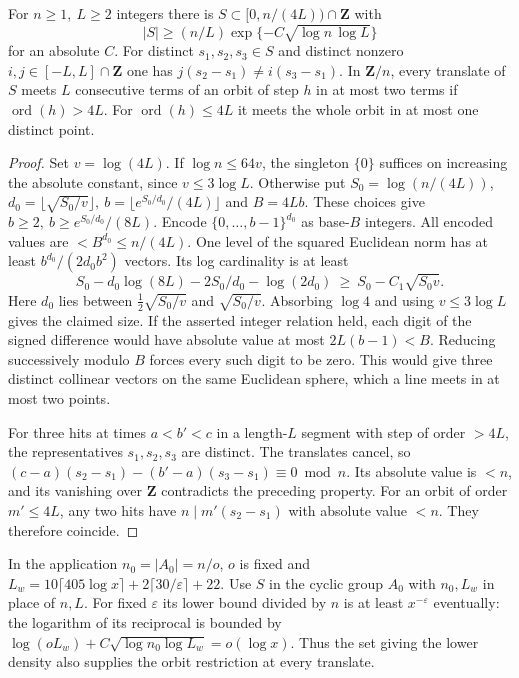 \begin{proposition}\label{host:behrend}
For \(n\ge1,\ L\ge2\) integers there is \(S\subset[0,n/(4L))\cap\mathbf Z\)
with
\[
 |S|\ge (n/L)\exp\{-C\sqrt{\log n\,\log L}\}
\]
for an absolute \(C\). For distinct \(s_1,s_2,s_3\in S\) and distinct
nonzero \(i,j\in[-L,L]\cap\mathbf Z\) one has
\(j(s_2-s_1)\ne i(s_3-s_1)\). In \(\mathbf Z/n\), every translate of
\(S\) meets \(L\) consecutive terms of an orbit of step \(h\) in at most
two terms if \(\operatorname{ord}(h)>4L\). For
\(\operatorname{ord}(h)\le4L\) it meets the whole orbit in at most one
distinct point.
\end{proposition}
\begin{proof}
Set \(v=\log(4L)\). If \(\log n\le64v\), the singleton \(\{0\}\)
suffices on increasing the absolute constant, since \(v\le3\log L\).
Otherwise put \(S_0=\log(n/(4L))\),
\(d_0=\lfloor\sqrt{S_0/v}\rfloor,\ b=\lfloor e^{S_0/d_0}/(4L)\rfloor\)
and \(B=4Lb\). These choices give \(b\ge2,\ b\ge e^{S_0/d_0}/(8L)\).
Encode \(\{0,\ldots,b-1\}^{d_0}\) as base-\(B\) integers. All encoded
values are \(<B^{d_0}\le n/(4L)\). One level of the squared Euclidean norm
has at least \(b^{d_0}/(2d_0 b^2)\) vectors. Its log cardinality is at least
\[
 S_0-d_0\log(8L)-2S_0/d_0-\log(2d_0)
 \ \ge\ S_0-C_1\sqrt{S_0 v}.
\]
Here \(d_0\) lies between \(\tfrac12\sqrt{S_0/v}\) and \(\sqrt{S_0/v}\).
Absorbing \(\log4\) and using \(v\le3\log L\) gives the claimed size.
If the asserted integer relation held, each digit of the signed
difference would have absolute value at most \(2L(b-1)<B\).
Reducing successively modulo \(B\) forces every such digit to be zero.
This would give three distinct collinear vectors on the same Euclidean
sphere, which a line meets in at most two points.

For three hits at times \(a<b'<c\) in a length-\(L\) segment with step
of order \(>4L\), the representatives \(s_1,s_2,s_3\) are distinct.
The translates cancel, so
\((c-a)(s_2-s_1)-(b'-a)(s_3-s_1)\equiv0\bmod n\).
Its absolute value is \(<n\), and its vanishing over \(\mathbf Z\)
contradicts the preceding property. For an orbit of order \(m'\le4L\),
any two hits have \(n\mid m'(s_2-s_1)\) with absolute value \(<n\).
They therefore coincide.
\end{proof}

In the application \(n_0=|A_0|=n/o\), \(o\) is fixed and
\(L_w=10\lceil405\log x\rceil+2\lceil30/\varepsilon\rceil+22\).
Use \(S\) in the cyclic group \(A_0\) with \(n_0,L_w\) in place of
\(n,L\). For fixed \(\varepsilon\) its lower bound divided by \(n\)
is at least \(x^{-\varepsilon}\) eventually: the logarithm of its
reciprocal is bounded by
\(\log(oL_w)+C\sqrt{\log n_0\log L_w}=o(\log x)\).
Thus the set giving the lower density also supplies the orbit restriction
at every translate.

